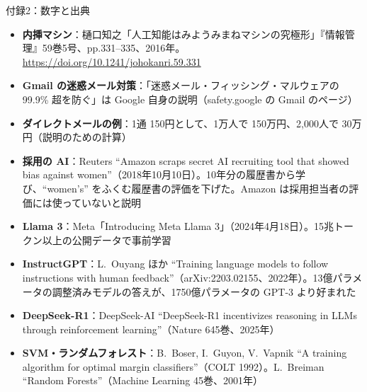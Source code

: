 \documentclass[aspectratio=169]{beamer}
\begin{document}
\begin{frame}{付録2：数字と出典}
\scriptsize
\begin{itemize}\setlength{\itemsep}{1pt}
  \item \textbf{内挿マシン}：樋口知之「人工知能はみようみまねマシンの究極形」『情報管理』59巻5号、pp.331--335、2016年。\url{https://doi.org/10.1241/johokanri.59.331}
  \item \textbf{Gmail の迷惑メール対策}：「迷惑メール・フィッシング・マルウェアの 99.9\% 超を防ぐ」は Google 自身の説明（safety.google の Gmail のページ）
  \item \textbf{ダイレクトメールの例}：1通 150円として、1万人で 150万円、2,000人で 30万円（説明のための計算）
  \item \textbf{採用の AI}：Reuters ``Amazon scraps secret AI recruiting tool that showed bias against women''（2018年10月10日）。10年分の履歴書から学び、``women's'' をふくむ履歴書の評価を下げた。Amazon は採用担当者の評価には使っていないと説明
  \item \textbf{Llama 3}：Meta「Introducing Meta Llama 3」（2024年4月18日）。15兆トークン以上の公開データで事前学習
  \item \textbf{InstructGPT}：L.~Ouyang ほか ``Training language models to follow instructions with human feedback''（arXiv:2203.02155、2022年）。13億パラメータの調整済みモデルの答えが、1750億パラメータの GPT-3 より好まれた
  \item \textbf{DeepSeek-R1}：DeepSeek-AI ``DeepSeek-R1 incentivizes reasoning in LLMs through reinforcement learning''（Nature 645巻、2025年）
  \item \textbf{SVM・ランダムフォレスト}：B.~Boser, I.~Guyon, V.~Vapnik ``A training algorithm for optimal margin classifiers''（COLT 1992）。L.~Breiman ``Random Forests''（Machine Learning 45巻、2001年）
\end{itemize}
\end{frame}
\end{document}
